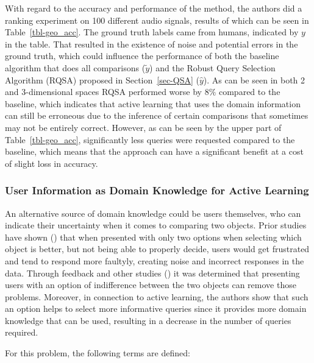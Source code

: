 \documentclass[
  letterpaper,
  numbers=noenddot,
  DIV=11,
  oneside]{scrreprt}
\theoremstyle{remark}
\begin{document}
With regard to the accuracy and performance of the method, the authors
did a ranking experiment on 100 different audio signals, results of
which can be seen in Table~\ref{tbl-geo_acc}. The ground truth labels
came from humans, indicated by \(y\) in the table. That resulted in the
existence of noise and potential errors in the ground truth, which could
influence the performance of both the baseline algorithm that does all
comparisons (\(\tilde{y}\)) and the Robust Query Selection Algorithm
(RQSA) proposed in Section~\ref{sec-QSA} (\(\hat{y}\)). As can be seen
in both 2 and 3-dimensional spaces RQSA performed worse by \(8\%\)
compared to the baseline, which indicates that active learning that uses
the domain information can still be erroneous due to the inference of
certain comparisons that sometimes may not be entirely correct. However,
as can be seen by the upper part of Table~\ref{tbl-geo_acc},
significantly less queries were requested compared to the baseline,
which means that the approach can have a significant benefit at a cost
of slight loss in accuracy.

\subsubsection{User Information as Domain Knowledge for Active
Learning}\label{sec-geo_app}

An alternative source of domain knowledge could be users themselves, who
can indicate their uncertainty when it comes to comparing two objects.
Prior studies have shown () that when presented with only two options when selecting which
object is better, but not being able to properly decide, users would get
frustrated and tend to respond more faultyly, creating noise and
incorrect responses in the data. Through feedback and other studies
() it was
determined that presenting users with an option of indifference between
the two objects can remove those problems. Moreover, in connection to
active learning, the authors show that such an option helps to select
more informative queries since it provides more domain knowledge that
can be used, resulting in a decrease in the number of queries required.

For this problem, the following terms are defined:
\end{document}
